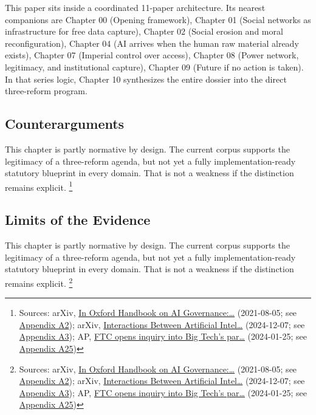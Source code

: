 \documentclass[
  american,
  11pt,
  letterpaper,
]{article}
\begin{document}
This paper sits inside a coordinated 11-paper architecture. Its nearest
companions are Chapter 00 (Opening framework), Chapter 01 (Social
networks as infrastructure for free data capture), Chapter 02 (Social
erosion and moral reconfiguration), Chapter 04 (AI arrives when the
human raw material already exists), Chapter 07 (Imperial control over
access), Chapter 08 (Power network, legitimacy, and institutional
capture), Chapter 09 (Future if no action is taken). In that series
logic, Chapter 10 synthesizes the entire dossier into the direct
three-reform program.

\subsection{Counterarguments}\label{counterarguments}

This chapter is partly normative by design. The current corpus supports
the legitimacy of a three-reform agenda, but not yet a fully
implementation-ready statutory blueprint in every domain. That is not a
weakness if the distinction remains explicit. \footnote{Sources: arXiv,
  \href{https://arxiv.org/abs/2108.07700}{In Oxford Handbook on AI
  Governance:\ldots{}} (2021-08-05; see
  \hyperref[appendix-a2-in-oxford-handbook-on-ai-governance-the-role-of-workers-in-ai-ethics-and-governance]{Appendix
  A2}); arXiv, \href{https://arxiv.org/abs/2412.05761}{Interactions
  Between Artificial Intel\ldots{}} (2024-12-07; see
  \hyperref[appendix-a3-interactions-between-artificial-intelligence-and-digital-public-infrastructure-concepts-benefits-and-challenges]{Appendix
  A3}); AP,
  \href{https://apnews.com/article/67feef411ef311f0be543f546ef34b3d}{FTC
  opens inquiry into Big Tech's par\ldots{}} (2024-01-25; see
  \hyperref[appendix-a25-ftc-opens-inquiry-into-big-tech-s-partnerships-with-leading-ai-startups]{Appendix
  A25})}

\subsection{Limits of the Evidence}\label{limits-of-the-evidence}

This chapter is partly normative by design. The current corpus supports
the legitimacy of a three-reform agenda, but not yet a fully
implementation-ready statutory blueprint in every domain. That is not a
weakness if the distinction remains explicit. \footnote{Sources: arXiv,
  \href{https://arxiv.org/abs/2108.07700}{In Oxford Handbook on AI
  Governance:\ldots{}} (2021-08-05; see
  \hyperref[appendix-a2-in-oxford-handbook-on-ai-governance-the-role-of-workers-in-ai-ethics-and-governance]{Appendix
  A2}); arXiv, \href{https://arxiv.org/abs/2412.05761}{Interactions
  Between Artificial Intel\ldots{}} (2024-12-07; see
  \hyperref[appendix-a3-interactions-between-artificial-intelligence-and-digital-public-infrastructure-concepts-benefits-and-challenges]{Appendix
  A3}); AP,
  \href{https://apnews.com/article/67feef411ef311f0be543f546ef34b3d}{FTC
  opens inquiry into Big Tech's par\ldots{}} (2024-01-25; see
  \hyperref[appendix-a25-ftc-opens-inquiry-into-big-tech-s-partnerships-with-leading-ai-startups]{Appendix
  A25})}
\end{document}
